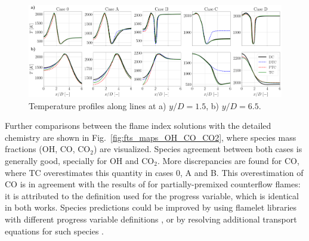 \documentclass[preprint,12pt,authoryear]{elsarticle}
\begin{document}
{\begin{figure}[h!]
        \centering
	\includegraphics[scale=0.16]{./figures/fts_profiles_T}
	\caption{Temperature profiles along lines at a) $y/D = 1.5$, b) $y/D = 6.5$.}
	\label{fig:fts_profiles_T_all}
\end{figure}

Further comparisons between the flame index solutions with the detailed chemistry are shown
in Fig.~\ref{fig:fts_maps_OH_CO_CO2}, where species mass fractions (OH, CO, CO$_2$) are visualized. Species agreement between both cases is generally good, specially for OH and CO$_2$. More discrepancies are found for CO, where TC overestimates this quantity in cases 0, A and B. This overestimation of CO is in agreement with the results of \cite{illana_extended_2021} for partially-premixed counterflow flames: it is attributed to the definition used for the progress variable, which is identical in both works. Species predictions could be improved by using flamelet libraries with different progress variable definitions \citep{both_high-fidelity_2023}, or by resolving additional transport equations for such species \citep{massey_large_2023}. 



}
\end{document}
